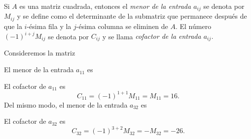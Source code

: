 \begin{definicion}{}{}
    Si $A$ es una matriz cuadrada, entonces el \emph{menor de la entrada $a_{ij}$} se denota por $M_{ij}$ y se define como el determinante de la submatriz que permanece después de que la $i$-ésima fila y la $j$-ésima columna se eliminen de $A$. El número $(-1)^{i+j} M_{ij}$ se denota por $C_{ij}$ y se llama \emph{cofactor de la entrada $a_{ij}$.}
\end{definicion}

\begin{examplebox}{}{}
    Consideremos la matriz
    \begin{matrizn}
    \end{matrizn}
    El menor de la entrada $a_{11}$ es
    \begin{matrizn}
    \end{matrizn}
    El cofactor de $a_{11}$ es
    $$C_{11} = (-1)^{1 + 1} M_{11} = M_{11} = 16.$$
    Del mismo modo, el menor de la entrada $a_{32}$ es
    \begin{matrizn}
    \end{matrizn}
    El cofactor de $a_{32}$ es
    $$C_{32} = (-1)^{3 + 2} M_{32} = -M_{32} = -26.$$
\end{examplebox}

